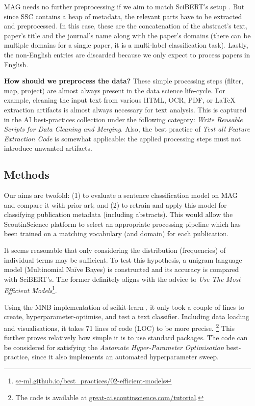 MAG needs no further preprocessing if we aim to match SciBERT's setup \cite{beltagy2019scibert}. But since SSC contains a heap of metadata, the relevant parts have to be extracted and preprocessed. In this case, these are the concatenation of the abstract's text, paper's title and the journal's name along with the paper's domains (there can be multiple domains for a single paper, it is a multi-label classification task). Lastly, the non-English entries are discarded because we only expect to process papers in  English.

\begin{displayquote}
\textbf{How should we preprocess the data?} These simple processing steps (filter, map, project) are almost always present in the data science life-cycle. For example, cleaning the input text from various HTML, OCR, PDF, or \LaTeX \hskip 0.12cm extraction artifacts is almost always necessary for text analysis. This is captured in the AI best-practices collection under the following category: \textit{Write Reusable Scripts for Data Cleaning and Merging}. Also, the best practice of \textit{Test all Feature Extraction Code} is somewhat applicable: the applied processing steps must not introduce unwanted artifacts.
\end{displayquote}

\subsection{Methods}

Our aims are twofold: (1) to evaluate a sentence classification model on MAG and compare it with prior art; and (2) to retrain and apply this model for classifying publication metadata (including abstracts). This would allow the ScoutinScience platform to select an appropriate processing pipeline which has been trained on a matching vocabulary (and domain) for each publication. 

It seems reasonable that only considering the distribution (frequencies) of individual terms may be sufficient. To test this hypothesis, a unigram language model (Multinomial Naïve Bayes) is constructed and its accuracy is compared with SciBERT's. The former definitely aligns with the advice to \textit{Use The Most Efficient Models}\footnote{\href{https://se-ml.github.io/best_practices/02-efficient-models/}{se-ml.github.io/best\_practices/02-efficient-models}}.

Using the MNB implementation of scikit-learn \cite{pedregosa2011scikit}, it only took a couple of lines to create, hyperparameter-optimise, and test a text classifier. Including data loading and visualisations, it takes 71 lines of code (LOC) to be more precise. \footnote{The code is available at \href{https://great-ai.scoutinscience.com/tutorial/}{great-ai.scoutinscience.com/tutorial}.} This further proves relatively how simple it is to use standard packages. The code can be considered for satisfying the \textit{Automate Hyper-Parameter Optimisation} best-practice, since it also implements an automated hyperparameter sweep. 

